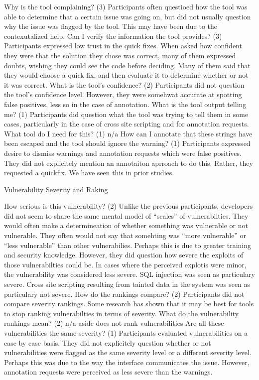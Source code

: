 \documentclass[twoside,letterpaper]{soups}
\begin{document}
Why is the tool complaining? (3) Participants often questioed how the tool was able to determine that a certain issue was going on, but did not usually question why the issue was flagged by the tool. This may have been due to the contexutalized help.
Can I verify the information the tool provides? (3) Participants expressed low trust in the quick fixes. When asked how confident they were that the solution they chose was correct, many of them expressed doubts, wishing they could see the code before deciding. Many of them said that they would choose a quick fix, and then evaluate it to determine whether or not it was correct.
What is the tool’s confidence? (2) Participants did not question the tool's confidence level. However, they were somehwat accurate at spotting false positives, less so in the case of annotation.
What is the tool output telling me? (1) Participants did question what the tool was trying to tell them in some cases, particularly in the case of cross site scripting and for annotation requests.
What tool do I need for this? (1) n/a
How can I annotate that these strings have been escaped and the
tool should ignore the warning? (1) Participants expressed desire to dismiss warnings and annotation requests which were false positives. They did not explicitely mention an annotaiton aprroach to do this.  Rather, they requested a quickfix. We have seen this in prior studies.

Vulnerability Severity and Raking

How serious is this vulnerability? (2) Unlike the previous participants, developers did not seem to share the same mental model of “scales” of vulnerabilties. They would often make a determineation of whether something was vulnerable or not vulnerable. They often would not say that somehting was “more vulnerable” or “less vulnerable” than other vulnerabilies. Perhaps this is due to greater training and security knowledge. However, they did question how severe the exploits of those vulnerabilties could be. In cases where the perceived explotis were minor, the vulnerability was considered less severe. SQL injection was seen as particulary severe. Cross site scripting resulting from tainted data in the system was seen as particulary not severe.
How do the rankings compare? (2) Participants did not compare severity rankings. Some research has shown that it may be best for tools to stop ranking vulnerabilties in terms of severity.
What do the vulnerability rankings mean? (2) n/a aside does not rank vulnerabilities
Are all these vulnerabilities the same severity? (1) Participants evaluated vulnerabilities on a case by case basis. They did not explicitely question whether or not vulnerabilities were flagged as the same severity level or a different severity level. Perhaps this was due to the way the interface communicates the issue. However, annotation requests were perceived as less severe than the warnings. 
\end{document}
